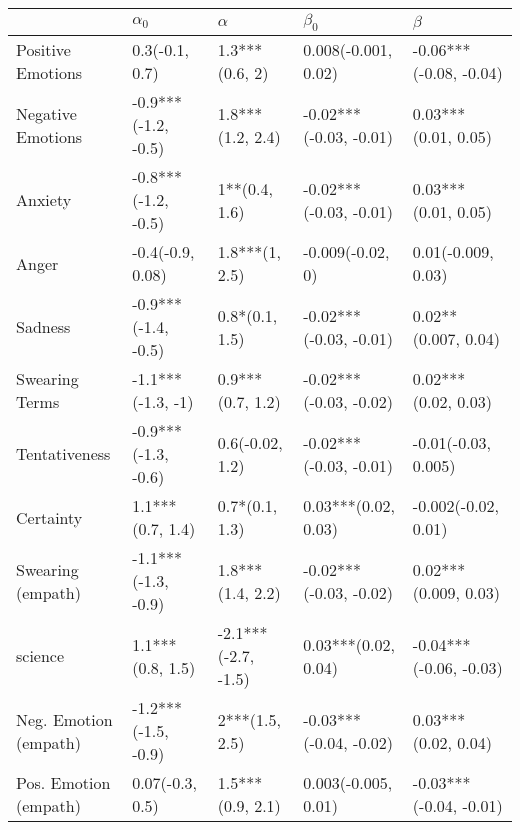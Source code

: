 \begin{tabular}{lllll}
\toprule
{} &           $\alpha_0$ &             $\alpha$ &               $\beta_0$ &                 $\beta$ \\
\midrule
Positive Emotions     &       0.3(-0.1, 0.7) &       1.3***(0.6, 2) &     0.008(-0.001, 0.02) &  -0.06***(-0.08, -0.04) \\
Negative Emotions     &  -0.9***(-1.2, -0.5) &     1.8***(1.2, 2.4) &  -0.02***(-0.03, -0.01) &     0.03***(0.01, 0.05) \\
Anxiety               &  -0.8***(-1.2, -0.5) &        1**(0.4, 1.6) &  -0.02***(-0.03, -0.01) &     0.03***(0.01, 0.05) \\
Anger                 &     -0.4(-0.9, 0.08) &       1.8***(1, 2.5) &        -0.009(-0.02, 0) &      0.01(-0.009, 0.03) \\
Sadness               &  -0.9***(-1.4, -0.5) &       0.8*(0.1, 1.5) &  -0.02***(-0.03, -0.01) &     0.02**(0.007, 0.04) \\
Swearing Terms        &    -1.1***(-1.3, -1) &     0.9***(0.7, 1.2) &  -0.02***(-0.03, -0.02) &     0.02***(0.02, 0.03) \\
Tentativeness         &  -0.9***(-1.3, -0.6) &      0.6(-0.02, 1.2) &  -0.02***(-0.03, -0.01) &     -0.01(-0.03, 0.005) \\
Certainty             &     1.1***(0.7, 1.4) &       0.7*(0.1, 1.3) &     0.03***(0.02, 0.03) &     -0.002(-0.02, 0.01) \\
Swearing (empath)     &  -1.1***(-1.3, -0.9) &     1.8***(1.4, 2.2) &  -0.02***(-0.03, -0.02) &    0.02***(0.009, 0.03) \\
science               &     1.1***(0.8, 1.5) &  -2.1***(-2.7, -1.5) &     0.03***(0.02, 0.04) &  -0.04***(-0.06, -0.03) \\
Neg. Emotion (empath) &  -1.2***(-1.5, -0.9) &       2***(1.5, 2.5) &  -0.03***(-0.04, -0.02) &     0.03***(0.02, 0.04) \\
Pos. Emotion (empath) &      0.07(-0.3, 0.5) &     1.5***(0.9, 2.1) &     0.003(-0.005, 0.01) &  -0.03***(-0.04, -0.01) \\
\bottomrule
\end{tabular}
